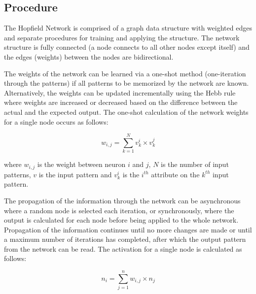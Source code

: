 \subsection{Procedure}
The Hopfield Network is comprised of a graph data structure with weighted edges and separate procedures for training and applying the structure. The network structure is fully connected (a node connects to all other nodes except itself) and the edges (weights) between the nodes are bidirectional. 

The weights of the network can be learned via a one-shot method (one-iteration through the patterns) if all patterns to be memorized by the network are known. Alternatively, the weights can be updated incrementally using the Hebb rule where weights are increased or decreased based on the difference between the actual and the expected output. The one-shot calculation of the network weights for a single node occurs as follows:

\begin{equation}
	w_{i,j} = \sum_{k=1}^{N} v_k^i\times v_k^j
\end{equation}

where $w_{i,j}$ is the weight between neuron $i$ and $j$, $N$ is the number of input patterns, $v$ is the input pattern and $v_k^i$ is the $i^{th}$ attribute on the $k^{th}$ input pattern.

The propagation of the information through the network can be asynchronous where a random node is selected each iteration, or synchronously, where the output is calculated for each node before being applied to the whole network. Propagation of the information continues until no more changes are made or until a maximum number of iterations has completed, after which the output pattern from the network can be read. The activation for a single node is calculated as follows:

\begin{equation}
	n_i = \sum_{j=1}^n w_{i,j}\times n_j
\end{equation}

